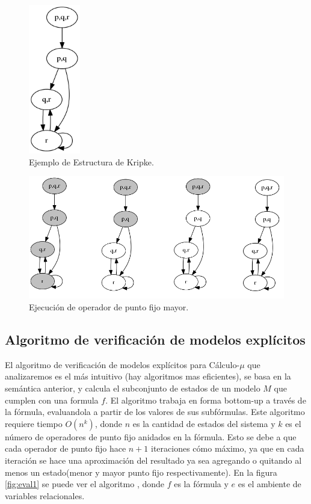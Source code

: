 \begin{figure}[h!]
  \centering
  \includegraphics[width=0.2\textwidth]{Figures/kripke3.png}
  \caption{Ejemplo de Estructura de Kripke.} 
  \label{fig:kripke3}
\end{figure}
\begin{figure}[H]
  \centering
  \includegraphics[width=1\textwidth]{Figures/kripke3-gfp1.png}
  \caption{Ejecución de operador de punto fijo mayor.} 
  \label{fig:kripke3-gfp1}
\end{figure}

\subsection{Algoritmo de verificación de modelos explícitos}

El algoritmo de verificación de modelos explícitos para Cálculo-$\mu$ que analizaremos es el más intuitivo (hay algoritmos mas eficientes), se basa en la semántica anterior, y calcula el subconjunto de estados de un modelo $M$ que cumplen con una formula $f$. El algoritmo trabaja en forma bottom-up a través de la fórmula, evaluandola a partir de los valores de sus subfórmulas. Este algoritmo requiere tiempo $O(n^{k})$, donde $n$ es la cantidad de estados del sistema y $k$ es el número de operadores de punto fijo anidados en la fórmula. Esto se debe a que cada operador de punto fijo hace $n+1$ iteraciones cómo máximo, ya que en cada iteración se hace una aproximación del resultado ya sea agregando o quitando al menos un estado(menor y mayor punto fijo respectivamente). En la figura \ref{fig:eval1} se puede ver el algoritmo \cite{Clarke:1}, donde $f$ es la fórmula y $e$ es el ambiente de variables relacionales.

